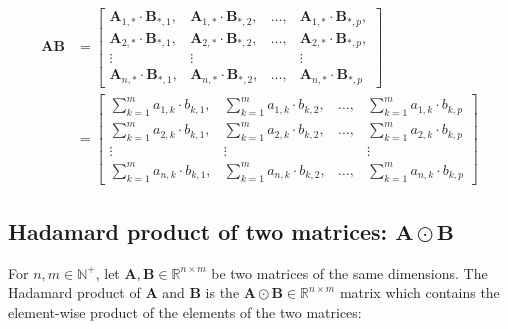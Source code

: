 \documentclass[titlepage]{article}
\begin{document}
        \begin{align*}
          \mathbf{AB}
            & = \begin{bmatrix}
                  \mathbf{A}_{1,*} \cdot \mathbf{B}_{*,1},
                    & \mathbf{A}_{1,*} \cdot \mathbf{B}_{*,2},
                    & \ldots,
                    & \mathbf{A}_{1,*} \cdot \mathbf{B}_{*,p}, \\
                  \mathbf{A}_{2,*} \cdot \mathbf{B}_{*,1},
                    & \mathbf{A}_{2,*} \cdot \mathbf{B}_{*,2},
                    & \ldots,
                    & \mathbf{A}_{2,*} \cdot \mathbf{B}_{*,p}, \\
                  \vdots & \vdots & & \vdots \\
                  \mathbf{A}_{n,*} \cdot \mathbf{B}_{*,1},
                    & \mathbf{A}_{n,*} \cdot \mathbf{B}_{*,2},
                    & \ldots,
                    & \mathbf{A}_{n,*} \cdot \mathbf{B}_{*,p}
                \end{bmatrix} \\
            & = \begin{bmatrix}
                  \sum_{k=1}^m a_{1,k} \cdot b_{k,1},
                    & \sum_{k=1}^m a_{1,k} \cdot b_{k,2},
                    & \ldots,
                    & \sum_{k=1}^m a_{1,k} \cdot b_{k,p} \\
                  \sum_{k=1}^m a_{2,k} \cdot b_{k,1},
                    & \sum_{k=1}^m a_{2,k} \cdot b_{k,2},
                    & \ldots,
                    & \sum_{k=1}^m a_{2,k} \cdot b_{k,p} \\
                  \vdots & \vdots & & \vdots \\
                  \sum_{k=1}^m a_{n,k} \cdot b_{k,1},
                    & \sum_{k=1}^m a_{n,k} \cdot b_{k,2},
                    & \ldots,
                    & \sum_{k=1}^m a_{n,k} \cdot b_{k,p}
                \end{bmatrix}
        \end{align*}

      \subsection{%
        Hadamard product of two matrices: $\mathbf{A} \odot \mathbf{B}$
      }

        For $n, m \in \mathbb{N}^+$, let
        $\mathbf{A}, \mathbf{B} \in \mathbb{R}^{n \times m}$ be
        two matrices of the same dimensions. The Hadamard product of
        $\mathbf{A}$ and $\mathbf{B}$ is the
        $\mathbf{A} \odot \mathbf{B} \in \mathbb{R}^{n \times m}$ matrix which
        contains the element-wise product of the elements of the two matrices:
\end{document}
